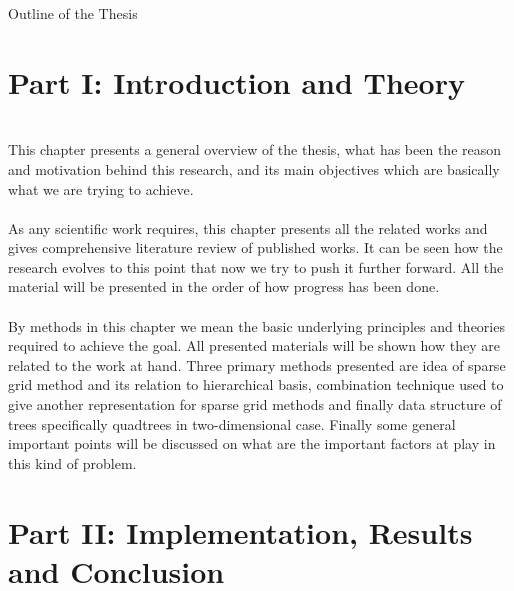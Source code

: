 \clearemptydoublepage

{}

\begin{center}
	\huge{Outline of the Thesis}
\end{center}




\section*{Part I: Introduction and Theory}

\\
\noindent  This chapter presents a general overview of the thesis, what has been the reason and motivation behind this research, and its main objectives which are basically what we are trying to achieve. \\

 \\
\noindent  As any scientific work requires, this chapter presents all the related works and gives comprehensive literature review of published works. It can be seen how the research evolves to this point that now we try to push it further forward. All the material will be presented in the order of how progress has been done. \\

\\
\noindent  By methods in this chapter we mean the basic underlying principles and theories required to achieve the goal. All presented materials will be shown how they are related to the work at hand. Three primary methods presented are idea of sparse grid method and its relation to hierarchical basis, combination technique used to give another representation for sparse grid methods and finally data structure of trees specifically quadtrees in two-dimensional case. Finally some general important points will be discussed on what are the important factors at play in this kind of problem.\\



\section*{Part II: Implementation, Results and Conclusion}


